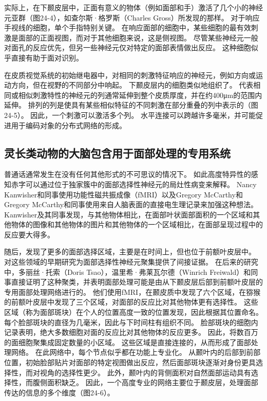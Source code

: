 实际上，在下颞皮层中，正面有意义的物体（例如面部和手）激活了几个小的神经元亚群（图24-4），如查尔斯·格罗斯（Charles Gross）所发现的那样。
对于响应手视线的细胞，单个手指特别关键。
在响应面部的细胞中，某些细胞的最有效刺激是面部的正面视图，而对于其他细胞来说，这是侧视图。
尽管某些神经元一般对面孔的反应优先，但另一些神经元仅对特定的面部表情做出反应。
这种细胞似乎直接有助于面对识别。


在皮质视觉系统的初始继电器中，对相同的刺激特征响应的神经元，例如方向或运动方向，但在视野的不同部分中响起。 下颞皮层内的细胞类似地组织了。 代表相同或相似刺激特性的神经元的列通常延伸到整个皮质厚度，并在约400μm的范围内延伸。 排列的列是使具有某些相似特征的不同刺激在部分重叠的列中表示的（图24-5）。 因此，一个刺激可以激活多个列。 水平连接可以跨越许多毫米，并可能促进用于编码对象的分布式网络的形成。

\subsection{灵长类动物的大脑包含用于面部处理的专用系统}
普通话通常发生在没有任何其他形式的不可思议的情况下。 如此高度特异性的感知赤字可以通过位于独家簇中的面部选择性神经元的局灶性病变来解释。 Nancy Kanwisher和同事使用功能性磁共振成像（fMRI）以及Gregory McCarthy和Gregory McCarthy和同事使用来自人脑表面的直接电生理记录来加强这种想法。 Kanwisher及其同事发现，与其他物体相比，在面部叶状面部面积的一个区域和其他物体的图像和其他物体的图片和其他物体的一个区域相比，在面部呈现过程中的反应要大得多。

随后，发现了更多的面部选择区域，主要是在时间上，但也位于前额叶皮层中。 对这些领域的早期研究为面部选择性神经元聚集提供了间接证据。 在后来的研究中，多丽丝·托索（Doris Tsao），温里希·弗莱瓦尔德（Winrich Freiwald）和同事直接证明了这种聚类，并表明面部处理可能是由从下颞皮层后部到前额叶皮层的专用面部处理网络进行的。 他们使用fMRI，在颞皮质中发现了六个区域，在猕猴的前额叶皮层中发现了三个区域，对面部的反应比对其他物体更有选择性。 这些区域（称为面部斑块）在个人的位置高度一致的位置发现，因此根据其位置命名。 每个脸部斑块的直径为几毫米，因此与下时间柱有组织不同。 脸部斑块的细胞内记录表明，绝大多数细胞对面的反应比对其他物体的反应更多。 因此，将数百万的面细胞聚集成固定数量的小区域。 这些区域是直接连接的，从而形成了面部处理网络。 在此网络中，每个节点似乎都在功能上专业化。 从颞叶内的后部到前部位置，初始脸部贴片对面部的特定视图做出反应，然后面部斑块逐渐对身份更具选择性，而对视角的选择性更少。 此外，颞叶内的背侧面积对自然面部运动具有选择性，而腹侧面积缺乏。 因此，一个高度专业的网络主要位于颞皮层，处理面部传达的信息的多个维度（图24-6）。

